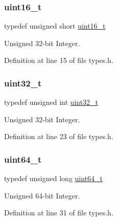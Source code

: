 \subsubsection{\texorpdfstring{uint16\+\_\+t}{uint16\_t}}
{\footnotesize\ttfamily typedef unsigned short \hyperlink{a00035_a273cf69d639a59973b6019625df33e30_a273cf69d639a59973b6019625df33e30}{uint16\+\_\+t}}



Unsigned 32-\/bit Integer. 



Definition at line 15 of file types.\+h.

\mbox{\label{a00035_a435d1572bf3f880d55459d9805097f62_a435d1572bf3f880d55459d9805097f62}} 
\subsubsection{\texorpdfstring{uint32\+\_\+t}{uint32\_t}}
{\footnotesize\ttfamily typedef unsigned int \hyperlink{a00035_a435d1572bf3f880d55459d9805097f62_a435d1572bf3f880d55459d9805097f62}{uint32\+\_\+t}}



Unsigned 32-\/bit Integer. 



Definition at line 23 of file types.\+h.

\mbox{\label{a00035_aa232ecf786a74ce5363c36c10798d2b1_aa232ecf786a74ce5363c36c10798d2b1}} 
\subsubsection{\texorpdfstring{uint64\+\_\+t}{uint64\_t}}
{\footnotesize\ttfamily typedef unsigned long \hyperlink{a00035_aa232ecf786a74ce5363c36c10798d2b1_aa232ecf786a74ce5363c36c10798d2b1}{uint64\+\_\+t}}



Unsigned 64-\/bit Integer. 



Definition at line 31 of file types.\+h.

\mbox{\label{a00035_aba7bc1797add20fe3efdf37ced1182c5_aba7bc1797add20fe3efdf37ced1182c5}} 
